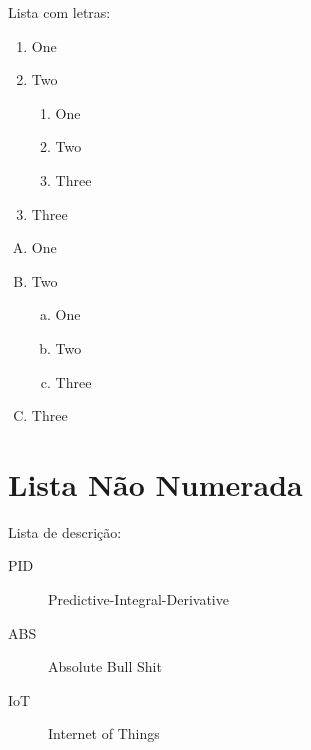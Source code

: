 Lista com letras:

\begin{enumerate}[A]
  \item One
  \item Two
        \begin{enumerate}[a]
          \item One
          \item Two
          \item Three
        \end{enumerate}
  \item Three
\end{enumerate}

\begin{enumerate}[(A)]
  \item One
  \item Two
        \begin{enumerate}[(a)]
          \item One
          \item Two
          \item Three
        \end{enumerate}
  \item Three
\end{enumerate}%

\section{Lista Não Numerada}

Lista de descrição:

\begin{description}
  \item[PID] Predictive-Integral-Derivative
  \item[ABS] Absolute Bull Shit
  \item[IoT] Internet of Things
\end{description}
